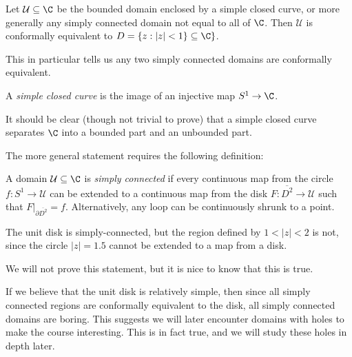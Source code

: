 \documentclass[a4paper]{article}
\begin{document}
\begin{thm}
  Let $\mathcal{U} \subseteq \C$ be the bounded domain enclosed by a simple closed curve, or more generally any simply connected domain not equal to all of $\C$. Then $\mathcal{U}$ is conformally equivalent to $D = \{z: |z| < 1\} \subseteq \C\}$.
\end{thm}
This in particular tells us any two simply connected domains are conformally equivalent.

\begin{defi}
  A \emph{simple closed curve} is the image of an injective map $S^1 \to \C$.
\end{defi}
It should be clear (though not trivial to prove) that a simple closed curve separates $\C$ into a bounded part and an unbounded part.

The more general statement requires the following definition:
\begin{defi}
  A domain $\mathcal{U}\subseteq \C$ is \emph{simply connected} if every continuous map from the circle $f: S^1 \to \mathcal{U}$ can be extended to a continuous map from the disk $F: \overline{D^2} \to \mathcal{U}$ such that $F|_{\partial \overline{D^2}} = f$. Alternatively, any loop can be continuously shrunk to a point.
\end{defi}

\begin{eg}
  The unit disk is simply-connected, but the region defined by $1 < |z| < 2$ is not, since the circle $|z| = 1.5$ cannot be extended to a map from a disk.
  \begin{center}
  \end{center}
\end{eg}
We will not prove this statement, but it is nice to know that this is true.

If we believe that the unit disk is relatively simple, then since all simply connected regions are conformally equivalent to the disk, all simply connected domains are boring. This suggests we will later encounter domains with holes to make the course interesting. This is in fact true, and we will study these holes in depth later.
\end{document}
